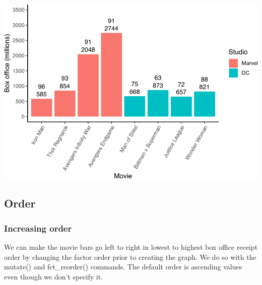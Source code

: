\documentclass[
]{krantz}
\makeatletter
\newenvironment{Shaded}{\begin{snugshade}}{\end{snugshade}}
\newcommand{\DataTypeTok}[1]{\textcolor[rgb]{0.27,0.27,0.27}{#1}}
\newcommand{\KeywordTok}[1]{\textcolor[rgb]{0.27,0.27,0.27}{\textbf{#1}}}
\newcommand{\NormalTok}[1]{#1}
\newcommand{\OperatorTok}[1]{\textcolor[rgb]{0.43,0.43,0.43}{\textbf{#1}}}
\newcommand{\StringTok}[1]{\textcolor[rgb]{0.5,0.5,0.5}{#1}}
\newenvironment{kframe}{%
\medskip{}
\setlength{\fboxsep}{.8em}
 \def\at@end@of@kframe{}%
 \ifinner\ifhmode%
  \def\at@end@of@kframe{\end{minipage}}%
  \begin{minipage}{\columnwidth}%
 \fi\fi%
 \def\FrameCommand##1{\hskip\@totalleftmargin \hskip-\fboxsep
 \colorbox{shadecolor}{##1}\hskip-\fboxsep
     \hskip-\linewidth \hskip-\@totalleftmargin \hskip\columnwidth}%
 \MakeFramed {\advance\hsize-\width
   \@totalleftmargin\z@ \linewidth\hsize
   \@setminipage}}%
 {\par\unskip\endMakeFramed%
 \at@end@of@kframe}
\renewenvironment{Shaded}{\begin{kframe}}{\end{kframe}}
\makeatother
\begin{document}
\includegraphics[width=0.65\linewidth]{bookdown_files/figure-latex/unnamed-chunk-278-1}

\hypertarget{order}{%
\subsection{Order}\label{order}}

\hypertarget{increasing-order}{%
\subsubsection{Increasing order}\label{increasing-order}}

We can make the movie bars go left to right in lowest to highest box office receipt order by changing the factor order prior to creating the graph. We do so with the mutate() and fct\_reorder() commands. The default order is ascending values even though we don't specify it.

\begin{Shaded}
\end{Shaded}
\end{document}
